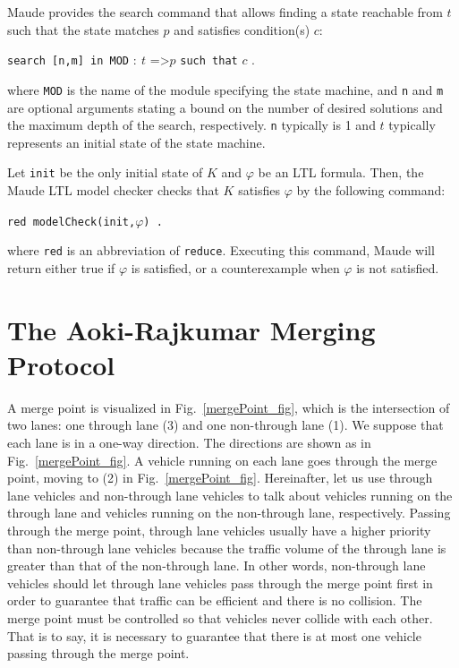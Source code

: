 \documentclass[10pt, conference, compsocconf]{IEEEtran}
\begin{document}
Maude provides the search command that allows finding a state reachable from
$t$ such that the state matches $p$ and satisfies condition(s) $c$:

\medskip
	\noindent
	\verb!search [n,m] in MOD! $:\ t$ =\textgreater* $p$ \verb!such that! $c$ .
\medskip

\noindent
where \verb!MOD! is the name of the module specifying the state
machine, and \verb!n! and \verb!m! are optional arguments stating a
bound on the number of desired solutions and the maximum depth of the
search, respectively.  \verb!n! typically is 1 and $t$ typically
represents an initial state of the state machine.

 Let \verb!init! be the only initial state of $K$ and $\varphi$ be an LTL
 formula. Then, the Maude LTL model checker checks that
 $K$ satisfies $\varphi$ by the following command:
 
 \smallskip
 \begin{small}
 	\noindent
 	\verb!red modelCheck(init,!$\varphi$\verb!) .!
 \end{small}
 \smallskip
 
 \noindent
 where \verb!red! is an abbreviation of \verb!reduce!. 
 Executing this command, Maude will return either true if $\varphi$ is satisfied, or a counterexample when $\varphi$ is not satisfied.


 
\section{The Aoki-Rajkumar Merging Protocol}
 \label{sect_oriproto}

A merge point is visualized in Fig.~\ref{mergePoint_fig}, which is the
intersection of two lanes: one through lane (3) and one non-through
lane (1).  We suppose that each lane is in a one-way direction.  The
directions are shown as in Fig.~\ref{mergePoint_fig}. A vehicle
running on each lane goes through the merge point, moving to (2) in
Fig.~\ref{mergePoint_fig}. Hereinafter, let us use through lane
vehicles and non-through lane vehicles to talk about vehicles running
on the through lane and vehicles running on the non-through lane,
respectively.  Passing through the merge point, through lane vehicles
usually have a higher priority than non-through lane vehicles because
the traffic volume of the through lane is greater than that of the
non-through lane. In other words, non-through lane vehicles should let
through lane vehicles pass through the merge point first in order to
guarantee that traffic can be efficient and there is no collision.
The merge point must be controlled so that vehicles never collide with
each other.  That is to say, it is necessary to guarantee that there
is at most one vehicle passing through the merge point.
\end{document}

